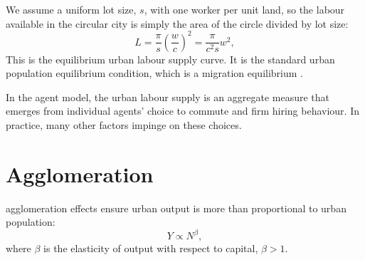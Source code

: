 We assume  a uniform lot size, $s$, with one worker per unit land, so the labour available in the \gls{circular city} is simply the area of the circle divided by lot size: 
\begin{equation}
 L = \frac{\pi}{s} \left(\frac{w}{{c}}\right)^2
   =\frac{\pi}{{c}^2 s} w^2,
\label{eqn-labour-supply1}
\end{equation}
This is the equilibrium \gls{urban labour supply} curve. It is the standard urban \gls{population equilibrium} condition, which is a \gls{migration equilibrium} \cite{migration_equilibOR_pop_equilib_condition}. %

In the agent model, the \gls{urban labour supply} is an \gls{aggregate} measure that emerges from individual agents' choice to commute %
and firm hiring behaviour. %
In practice, many other factors impinge on these choices. %

\section{Agglomeration}

 \Glspl{agglomeration effect} ensure urban \gls{output} is more than proportional to urban population: 
 \begin{equation}
 Y\propto N^{\beta},
 \label{eqn-production-population}
 \end{equation}
where $\beta$ is the elasticity of output with respect to capital,  $\beta >1$.   


